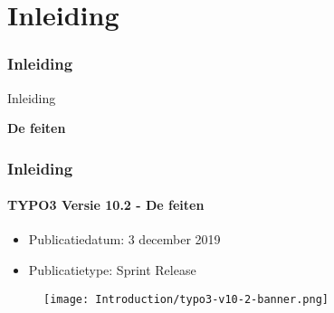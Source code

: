 %

\section{Inleiding}
\begin{frame}[fragile]
	\frametitle{Inleiding}

	\begin{center}\huge{Inleiding}\end{center}
	\begin{center}\huge{\color{typo3darkgrey}\textbf{De feiten}}\end{center}

\end{frame}


\begin{frame}[fragile]
	\frametitle{Inleiding}
	\framesubtitle{TYPO3 Versie 10.2 - De feiten}

	\begin{itemize}
		\item Publicatiedatum: 3 december 2019
		\item Publicatietype: Sprint Release
	\end{itemize}

	\begin{figure}
		\texttt{[image: Introduction/typo3-v10-2-banner.png]}
	\end{figure}

\end{frame}


